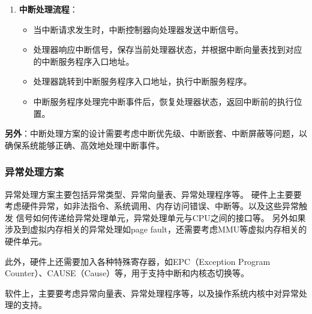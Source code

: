 \documentclass[12pt,hyperref,a4paper,UTF8]{ctexart}
\begin{document}
\begin{enumerate}
    \item \textbf{中断处理流程}：
    \begin{itemize}
        \item 当中断请求发生时，中断控制器向处理器发送中断信号。
        \item 处理器响应中断信号，保存当前处理器状态，并根据中断向量表找到对应的中断服务程序入口地址。
        \item 处理器跳转到中断服务程序入口地址，执行中断服务程序。
        \item 中断服务程序处理完中断事件后，恢复处理器状态，返回中断前的执行位置。
    \end{itemize}
\end{enumerate}

\textbf{另外}：中断处理方案的设计需要考虑中断优先级、中断嵌套、中断屏蔽等问题，以确保系统能够正确、高效地处理中断事件。


\subsubsection*{异常处理方案}
\normalsize

异常处理方案主要包括异常类型、异常向量表、异常处理程序等。
硬件上主要要考虑硬件异常，如非法指令、系统调用、内存访问错误、中断等。以及这些异常触发
信号如何传递给异常处理单元，异常处理单元与CPU之间的接口等。
另外如果涉及到虚拟内存相关的异常处理如page fault，还需要考虑MMU等虚拟内存相关的硬件单元。

此外，硬件上还需要加入各种特殊寄存器，如EPC（Exception Program Counter）、CAUSE（Cause）等，用于支持中断和内核态切换等。


软件上，主要要考虑异常向量表、异常处理程序等，以及操作系统内核中对异常处理的支持。
\end{document}
